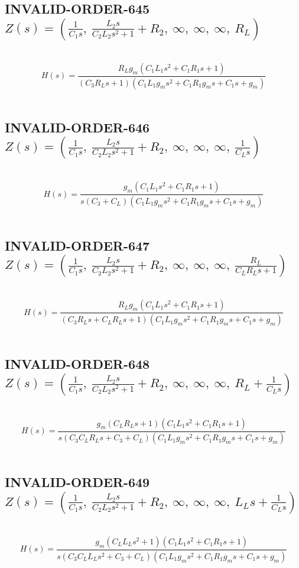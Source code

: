 \documentclass{article}
\begin{document}
\subsection{INVALID-ORDER-645 $Z(s) = \left( \frac{1}{C_{1} s}, \  \frac{L_{2} s}{C_{2} L_{2} s^{2} + 1} + R_{2}, \  \infty, \  \infty, \  \infty, \  R_{L}\right)$ } \ 
\textbf{\[H(s) = \frac{R_{L} g_{m} \left(C_{1} L_{1} s^{2} + C_{1} R_{1} s + 1\right)}{\left(C_{3} R_{L} s + 1\right) \left(C_{1} L_{1} g_{m} s^{2} + C_{1} R_{1} g_{m} s + C_{1} s + g_{m}\right)}\] } \ 
\subsection{INVALID-ORDER-646 $Z(s) = \left( \frac{1}{C_{1} s}, \  \frac{L_{2} s}{C_{2} L_{2} s^{2} + 1} + R_{2}, \  \infty, \  \infty, \  \infty, \  \frac{1}{C_{L} s}\right)$ } \ 
\textbf{\[H(s) = \frac{g_{m} \left(C_{1} L_{1} s^{2} + C_{1} R_{1} s + 1\right)}{s \left(C_{3} + C_{L}\right) \left(C_{1} L_{1} g_{m} s^{2} + C_{1} R_{1} g_{m} s + C_{1} s + g_{m}\right)}\] } \ 
\subsection{INVALID-ORDER-647 $Z(s) = \left( \frac{1}{C_{1} s}, \  \frac{L_{2} s}{C_{2} L_{2} s^{2} + 1} + R_{2}, \  \infty, \  \infty, \  \infty, \  \frac{R_{L}}{C_{L} R_{L} s + 1}\right)$ } \ 
\textbf{\[H(s) = \frac{R_{L} g_{m} \left(C_{1} L_{1} s^{2} + C_{1} R_{1} s + 1\right)}{\left(C_{3} R_{L} s + C_{L} R_{L} s + 1\right) \left(C_{1} L_{1} g_{m} s^{2} + C_{1} R_{1} g_{m} s + C_{1} s + g_{m}\right)}\] } \ 
\subsection{INVALID-ORDER-648 $Z(s) = \left( \frac{1}{C_{1} s}, \  \frac{L_{2} s}{C_{2} L_{2} s^{2} + 1} + R_{2}, \  \infty, \  \infty, \  \infty, \  R_{L} + \frac{1}{C_{L} s}\right)$ } \ 
\textbf{\[H(s) = \frac{g_{m} \left(C_{L} R_{L} s + 1\right) \left(C_{1} L_{1} s^{2} + C_{1} R_{1} s + 1\right)}{s \left(C_{3} C_{L} R_{L} s + C_{3} + C_{L}\right) \left(C_{1} L_{1} g_{m} s^{2} + C_{1} R_{1} g_{m} s + C_{1} s + g_{m}\right)}\] } \ 
\subsection{INVALID-ORDER-649 $Z(s) = \left( \frac{1}{C_{1} s}, \  \frac{L_{2} s}{C_{2} L_{2} s^{2} + 1} + R_{2}, \  \infty, \  \infty, \  \infty, \  L_{L} s + \frac{1}{C_{L} s}\right)$ } \ 
\textbf{\[H(s) = \frac{g_{m} \left(C_{L} L_{L} s^{2} + 1\right) \left(C_{1} L_{1} s^{2} + C_{1} R_{1} s + 1\right)}{s \left(C_{3} C_{L} L_{L} s^{2} + C_{3} + C_{L}\right) \left(C_{1} L_{1} g_{m} s^{2} + C_{1} R_{1} g_{m} s + C_{1} s + g_{m}\right)}\] } \ 
\end{document}
